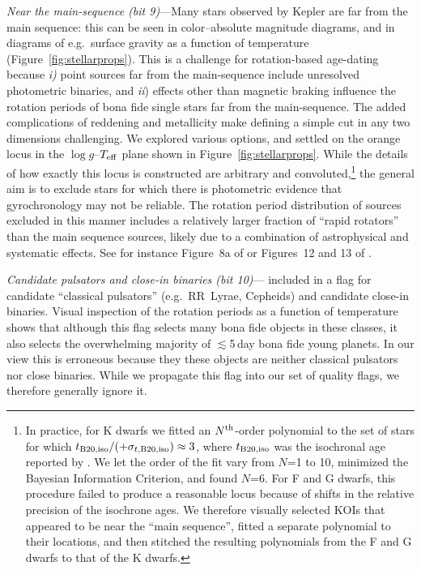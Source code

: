 \documentclass[11pt,twocolumn,tighten]{aastex63}
\begin{document}
{\it Near the main-sequence (bit 9)}---Many stars observed by Kepler
are far from the main sequence: this can be seen in color--absolute
magnitude diagrams, and in diagrams of e.g.~surface gravity as a
function of temperature (Figure~\ref{fig:stellarprops}).  This is a
challenge for rotation-based age-dating because {\it i)} point sources
far from the main-sequence include unresolved photometric binaries,
and {\it ii}) effects other than magnetic braking influence the
rotation periods of bona fide single stars far from the main-sequence.
The added complications of reddening and metallicity make defining a
simple cut in any two dimensions challenging.  
We explored various options, and settled on the orange locus in the
$\log g$--$T_{\rm eff}$ plane shown in Figure~\ref{fig:stellarprops}.
While the details of how exactly this locus is constructed are
arbitrary and convoluted,\footnote{In practice, for K dwarfs we fitted an
$N^{\rm th}$-order polynomial to the set of stars for which $t_{\rm
B20,iso}/(+\sigma_{t,{\rm B20,iso}})\approx 3$, where
$t_{\rm B20,iso}$ was the isochronal age reported by
\citet{Berger_2020a_catalog}. We let the order of the fit vary from
$N$=1 to 10, minimized the Bayesian Information Criterion,
and found $N$=6.  For F and G dwarfs, this procedure failed to produce
a reasonable locus because of shifts in the relative precision of
the isochrone ages.  We therefore visually selected KOIs that appeared
to be near the ``main sequence'', fitted a separate polynomial to
their locations, and then stitched the resulting polynomials from the
F and G dwarfs to that of the K dwarfs.} the general 
aim is to exclude stars for which there is photometric evidence
that gyrochronology may not be reliable.  The rotation period
distribution of sources excluded in this manner includes a relatively
larger fraction of ``rapid rotators'' than the main sequence sources,
likely due to a combination of astrophysical and systematic effects.
See for instance Figure~8a of \citet{2022AJ....164..137K} or Figures~12 and 13
of \citet{2023ApJS..268....4F}.


{\it Candidate pulsators and close-in binaries (bit
10)}---\citeauthor{Santos_2021} included in a flag for candidate
``classical pulsators'' (e.g.\ RR~Lyrae, Cepheids) and candidate
close-in binaries.  Visual inspection of the rotation periods as a
function of temperature shows that although this flag selects many
bona fide objects in these classes, it also selects the overwhelming
majority of $\lesssim$5\,day bona fide young planets.  In our view this is
erroneous because they these objects are neither classical pulsators nor
close binaries.  While we
propagate this flag into our set of quality flags, we therefore
generally ignore it.
\end{document}

